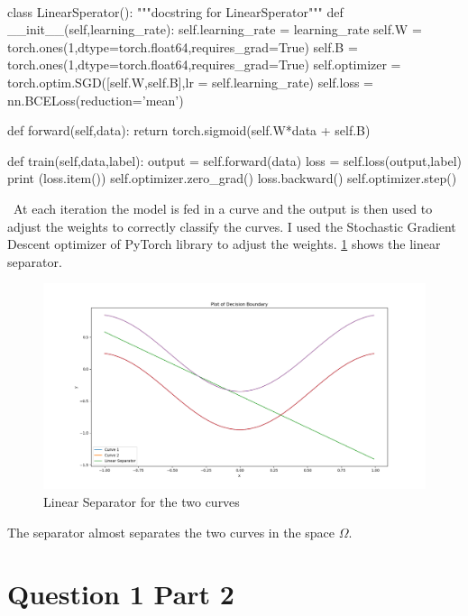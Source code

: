 \documentclass[12pt]{report}
\begin{document}
\

\begin{python}
class LinearSperator():
	"""docstring for LinearSperator"""
	def __init__(self,learning_rate):
		self.learning_rate = learning_rate
		self.W = torch.ones(1,dtype=torch.float64,requires_grad=True)
		self.B = torch.ones(1,dtype=torch.float64,requires_grad=True)
		self.optimizer = torch.optim.SGD([self.W,self.B],lr = self.learning_rate)
		self.loss = nn.BCELoss(reduction='mean')


	def forward(self,data):
		return torch.sigmoid(self.W*data + self.B)


	def train(self,data,label):
		output = self.forward(data)
		loss = self.loss(output,label)
		print (loss.item())
		self.optimizer.zero_grad()
		loss.backward()
		self.optimizer.step()
\end{python}

\
At each iteration the model is fed in a curve and the output is then used to adjust the weights to correctly classify the curves. I used the Stochastic Gradient Descent optimizer of PyTorch library to adjust the weights. \figurename{\ref{fig:2}} shows the linear separator.

\begin{figure}[H]
	\begin{center}
		\includegraphics[scale = 0.3]{que1_seperator}
		\caption{Linear Separator for the two curves}
		\label{fig:2}
	\end{center}
\end{figure} 

 The separator almost separates the two curves in the space $\Omega$.
 
\section{Question 1 Part 2}
\end{document}
